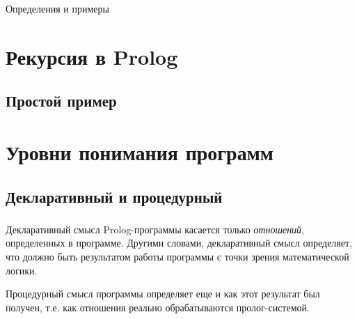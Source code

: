 
\begin{frame}[plain,c]

	\begin{center}
		\Huge Определения и примеры
	\end{center}

\end{frame}

\section{Рекурсия в Prolog}
\subsection{Простой пример}


\section{Уровни понимания программ}
\subsection{Декларативный и процедурный}

\begin{frame}
	\frametitle{\insertsection}
	\framesubtitle{\insertsubsection}
	\alert{Декларативный смысл} Prolog-программы касается только \textit{отношений}, определенных в программе.
	Другими словами, декларативный смысл определяет, что должно быть результатом работы программы с точки зрения математической логики.
	
	\alert{Процедурный смысл} программы определяет еще и как этот результат был получен, т.е. как отношения реально обрабатываются пролог-системой.
\end{frame}

